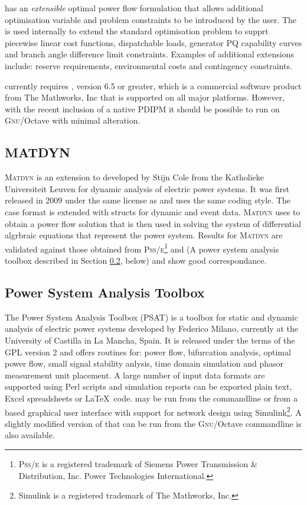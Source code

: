 \matpower has an \textit{extensible} optimal power flow formulation that allows
additional optimisation variable and problem constraints to be introduced by
the user.  The is used internally to extend the standard optimisation problem
to supprt piecewise linear cost functions, dispatchable loads, generator PQ
capability curves and branch angle difference limit constraints.  Examples of
additional extensions include: reserve requirements, environmental costs and
contingency constraints.

\matpower currently requires \matlab, version 6.5 or greater, which is a
commercial software product from The Mathworks, Inc that is supported on all
major platforms.  However, with the recent inclusion of a native PDIPM it
should be possible to run \matpower on \textsc{Gnu}/Octave with minimal
alteration.

\subsection{MATDYN}
\textsc{Matdyn} is an extension to \matpower developed by Stijn Cole from the
Katholieke Universiteit Leuven for dynamic analysis of electric power systems.
It was first released in 2009 under the same license as \matpower and uses the
same coding style.  The \matpower case format is extended with structs
for dynamic and event data.  \textsc{Matdyn} uses \matpower to obtain a power flow solution that is then used in solving the system of differential algrbraic equations that represent the
power system.  Results for \textsc{Matdyn} are validated against those obtained from
\textsc{Pss/e}\footnote{\textsc{Pss/e} is a registered trademark of Siemens Power
Transmission \& Distribution, Inc. Power Technologies International.} and
\psat (A power system analysis toolbox described in Section \ref{sec:psat},
below) and show good correspondance.

\subsection{Power System Analysis Toolbox}
\label{sec:psat}
The Power System Analysis Toolbox (PSAT) is a \matlab toolbox for static and
dynamic analysis of electric power systems developed by Federico Milano,
currently at the University of Castilla in La Mancha, Spain.  It is released
under the terms of the GPL version 2 and offers routines for:
power flow, bifurcation analysis, optimal power flow, small signal stability anlysis, time
domain simulation and phasor measurement unit placement.  A large number of
input data formats are supported using Perl scripts and simulation reports can
be exported plain text, Excel spreadsheets or \LaTeX~code.  \psat may be run
from the \matlab commandline or from a \matlab based graphical user interface
with support for network design using Simulink\footnote{Simulink is a
registered trademark of The Mathworks, Inc.}.  A slightly modified version of
\psat that can be run from the \textsc{Gnu}/Octave commandline is also
available.


